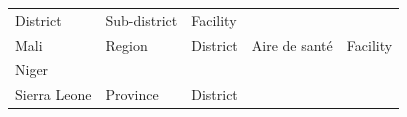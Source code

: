 \documentclass[]{book}
\begin{document}
\begin{longtable}[]{@{}lllll@{}}
\begin{minipage}[t]{0.20\columnwidth}
District\strut
\end{minipage} & \begin{minipage}[t]{0.20\columnwidth}\raggedright
Sub-district\strut
\end{minipage} & \begin{minipage}[t]{0.20\columnwidth}\raggedright
Facility\strut
\end{minipage}\tabularnewline
\begin{minipage}[t]{0.07\columnwidth}\raggedright
Mali\strut
\end{minipage} & \begin{minipage}[t]{0.20\columnwidth}\raggedright
Region\strut
\end{minipage} & \begin{minipage}[t]{0.20\columnwidth}\raggedright
District\strut
\end{minipage} & \begin{minipage}[t]{0.20\columnwidth}\raggedright
Aire de santé\strut
\end{minipage} & \begin{minipage}[t]{0.20\columnwidth}\raggedright
Facility\strut
\end{minipage}\tabularnewline
\begin{minipage}[t]{0.07\columnwidth}\raggedright
Niger\strut
\end{minipage} & \begin{minipage}[t]{0.20\columnwidth}\raggedright
\strut
\end{minipage} & \begin{minipage}[t]{0.20\columnwidth}\raggedright
\strut
\end{minipage} & \begin{minipage}[t]{0.20\columnwidth}\raggedright
\strut
\end{minipage} & \begin{minipage}[t]{0.20\columnwidth}\raggedright
\strut
\end{minipage}\tabularnewline
\begin{minipage}[t]{0.07\columnwidth}\raggedright
Sierra Leone\strut
\end{minipage} & \begin{minipage}[t]{0.20\columnwidth}\raggedright
Province\strut
\end{minipage} & \begin{minipage}[t]{0.20\columnwidth}\raggedright
District\strut
\end{minipage} & \begin{minipage}[t]{0.20\columnwidth}\raggedright

\end{minipage}
\end{longtable}
\end{document}
